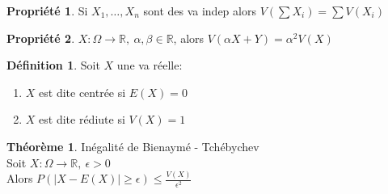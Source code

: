 \documentclass[fleqn]{article}
\theoremstyle{definition} \newtheorem*{defi}{D\'efinition}
\theoremstyle{definition} \newtheorem*{theo}{Th\'eor\`eme}
\theoremstyle{definition} \newtheorem*{coro}{Corollaire}
\theoremstyle{remark} \newtheorem*{rqs}{Remarques}
\theoremstyle{definition} \newtheorem*{prop}{Propri\'et\'e}
\begin{document}
\begin{prop}
	Si $X_1, \hdots, X_n$ sont des va indep alors $V(\sum X_i) = \sum V(X_i)$
\end{prop}

\begin{prop}
	$X:\Omega \rightarrow \mathbb{R},\ \alpha, \beta \in \mathbb{R}$, alors $V(\alpha X + Y) = \alpha^2 V(X)$
\end{prop}

\begin{defi} Soit $X$ une va r\'eelle:
	\begin{enumerate}
		\item $X$ est dite centr\'ee si $E(X) = 0$
		\item $X$ est dite r\'ediute si $V(X) = 1$
	\end{enumerate}
\end{defi}

\begin{theo} In\'egalit\'e de Bienaym\'e - Tch\'ebychev\\
	Soit $X: \Omega \rightarrow \mathbb{R},\ \epsilon > 0$ \\
	Alors $P(|X-E(X)|\geq \epsilon) \leq \frac{V(X)}{\epsilon^2}$
\end{theo}
\end{document}
